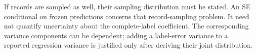 If records are sampled as well, their sampling distribution must be stated.
An SE conditional on frozen predictions concerns that record-sampling
problem. It need not quantify uncertainty about the complete-label
coefficient. The corresponding variance components can be dependent; adding
a label-error variance to a reported regression variance is justified only
after deriving their joint distribution.
